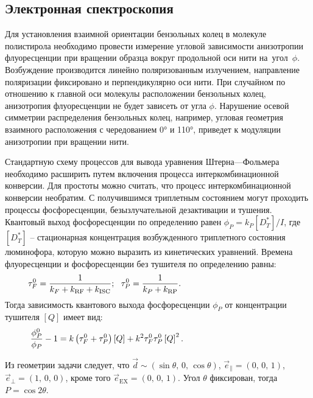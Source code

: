 \subsection{Электронная спектроскопия}
 Для установления взаимной ориентации бензольных колец в молекуле полистирола необходимо провести измерение угловой зависимости анизотропии флуоресценции при вращении образца вокруг продольной оси нити на~угол~$\phi$. Возбуждение производится линейно поляризованным излучением, направление поляризации фиксировано и перпендикулярно оси нити. При случайном по отношению к главной оси молекулы расположении бензольных колец, анизотропия флуоресценции не будет зависеть от угла $\phi$. Нарушение осевой симметрии распределения бензольных колец, например, угловая геометрия взаимного расположения с чередованием 0° и 110°, приведет к модуляции анизотропии при вращении нити.\par
{} Стандартную схему процессов для вывода уравнения Штерна—Фольмера необходимо расширить путем включения процесса интеркомбинационной конверсии. Для простоты можно считать, что процесс интеркомбинационной конверсии необратим. С получившимся триплетным состоянием могут проходить процессы фосфоресценции, безызлучательной дезактивации и тушения. Квантовый выход фосфоресценции по определению равен $\phi_P = k_P \left[ D_T^* \right]/I$, где~$\left[ D_T^* \right]$ – стационарная концентрация возбужденного триплетного состояния люминофора, которую можно выразить из кинетических уравнений. Времена флуоресценции и фосфоресценции без тушителя по определению равны:
\begin{equation*}
\begin{aligned}
& \tau_{F}^0= \dfrac{1}{k_F + k_{\text{RF}} + k_{\text{ISC}}}; \,\,\,\, \tau_{P}^0 = \dfrac{1}{k_P + k_{\text{RP}}}. \hspace{41mm}
\end{aligned}
\end{equation*}
Тогда зависимость квантового выхода фосфоресценции $\phi_P$ от концентрации тушителя $\left[Q \right]$ имеет вид:
\begin{equation*}
\begin{aligned}
& \dfrac{\phi^0_P}{\phi_P} - 1 = k\left( \tau_{F}^0 + \tau_{P}^0 \right) \left[ Q \right] + k^2 \tau_{F}^0 \tau_{P}^0 \left[ Q \right]^2. \hspace{39mm}
\end{aligned}
\end{equation*}
\par
{} Из геометрии задачи следует, что $\vec{d} \sim (\sin{\theta},\,0,\,\cos{\theta})$, $\vec{e}_{\parallel} = (0,\,0,\,1)$, $\vec{e}_{\perp} = (1,\,0,\,0)$, кроме того $\vec{e}_{\text{EX}} = (0,\,0,\,1)$. Угол $\theta$ фиксирован, тогда $P = \cos{2\theta}$.\par
